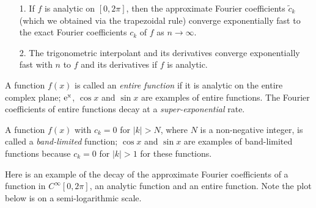 \documentclass[12pt,a4paper]{article}
\begin{document}
\begin{itemize}
\item[1. ] If $f$ is analytic on $[0, 2\pi]$, then the approximate Fourier coefficients $\widetilde{c}_k$ (which we obtained via the trapezoidal rule) converge exponentially fast to the exact Fourier coefficients $c_k$ of $f$ as $n \to \infty$.   


\item[2. ] The trigonometric interpolant and its derivatives converge exponentially fast with $n$ to $f$ and its derivatives if $f$ is analytic.

\end{itemize}
A function $f(x)$ is called an \emph{entire function} if it is analytic on the entire complex plane; ${\rm e^{x}}$, $\cos x$ and $\sin x$ are examples of entire functions. The Fourier coefficients of entire functions decay at a \emph{super-exponential} rate.

A function $f(x)$ with $c_{k} = 0$ for $\vert k \vert > N$, where $N$ is a non-negative integer, is called a \emph{band-limited} function; $\cos x$ and $\sin x$ are examples of band-limited functions because $c_{k} = 0$ for $\vert k \vert > 1$ for these functions.

Here is an example of the decay of the approximate Fourier coefficients of a function in $C^{\infty}[0, 2\pi]$, an analytic function and an entire function. Note the plot below is on a semi-logarithmic scale.
\end{document}
